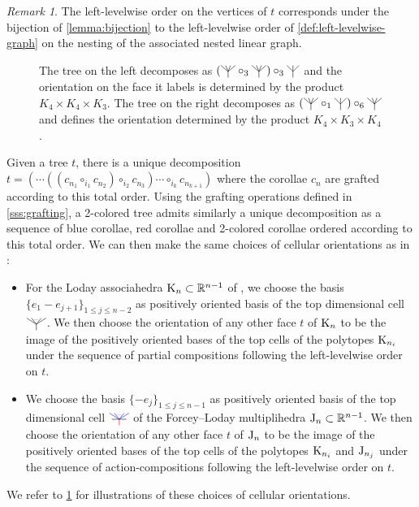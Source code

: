 \documentclass[twoside, 12pt]{amsart}
\theoremstyle{remark}
\newtheorem{remark}[definition]{\sc Remark}
\begin{document}
\begin{remark}
The left-levelwise order on the vertices of $t$ corresponds under the bijection of \cref{lemma:bijection} to the left-levelwise order of \cref{def:left-levelwise-graph} on the nesting of the associated nested linear graph.
\end{remark}

\begin{figure}
    \centering
    \begin{subfigure}{0.4\textwidth}
    \centering
    \exampleleftlevelwiseone
    \end{subfigure}
    \begin{subfigure}{0.4\textwidth}
    \centering
    \exampleleftlevelwisetwo
    \end{subfigure}
    \caption*{The tree on the left decomposes as $(\arbreopquatre \circ_3 \arbreopquatre ) \circ_3 \arbreoptrois$ and the orientation on the face it labels is determined by the product $K_4 \times K_4 \times K_3$. The tree on the right decomposes as $ (\arbreopquatre \circ_1 \arbreoptrois ) \circ_6 \arbreopquatre$ and defines the orientation determined by the product $K_4 \times K_3 \times K_4$.}
    \label{fig:left-levelwise-order}
\end{figure}

Given a tree $t$, there is a unique decomposition $t=(\cdots ((c_{n_1} \circ_{i_1} c_{n_2})\circ_{i_2}c_{n_3})\cdots \circ_{i_k} c_{n_{k+1}})$ where the corollae $c_n$ are grafted according to this total order. Using the grafting operations defined in \cref{sss:grafting}, a 2-colored tree admits similarly a unique decomposition as a sequence of blue corollae, red corollae and 2-colored corollae ordered according to this total order. 
We can then make the same choices of cellular orientations as in \cite[I, Section 4]{Mazuir21} :
\begin{itemize}
  \item For the Loday associahedra $\mathrm{K}_n \subset \mathbb{R}^{n-1}$ of \cite{MTTV19}, we choose the basis $\{e_1 - e_{j+1}\}_{1\leq j \leq n-2}$ as positively oriented basis of the top dimensional cell $\arbreop{0.15}$. We then choose the orientation of any other face $t$ of $\mathrm{K}_n$ to be the image of the positively oriented bases of the top cells of the polytopes $\mathrm{K}_{n_i}$ under the sequence of partial compositions following the left-levelwise order on $t$. 
  \item We choose the basis $\{- e_j\}_{1\leq j \leq n-1}$ as positively oriented basis of the top dimensional cell $\arbreopmorph{0.15}$ of the Forcey--Loday multiplihedra $\mathrm{J}_n \subset \mathbb{R}^{n-1}$. We then choose the orientation of any other face $t$ of $\mathrm{J}_n$ to be the image of the positively oriented bases of the top cells of the polytopes $\mathrm{K}_{n_i}$ and $\mathrm{J}_{n_j}$ under the sequence of action-compositions following the left-levelwise order on $t$.
\end{itemize}
We refer to \ref{fig:left-levelwise-order} for illustrations of these choices of cellular orientations.
\end{document}
